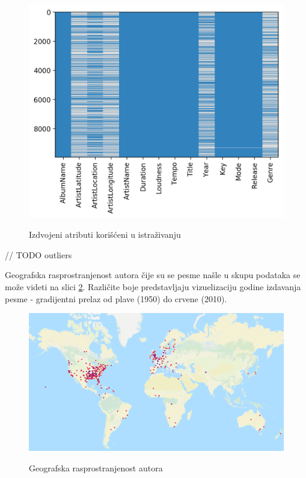 \begin{figure}[H]
    \centering
    \includegraphics[scale=0.6]{resources/after_processing.png}
    \label{fig:after}
    \caption{Izdvojeni atributi kori\v{s}\'c{}eni u istra\v{z}ivanju}
\end{figure}

// TODO outliers

Geografska rasprostranjenost autora \v{c}ije su se pesme na\v{s}le u skupu podataka se mo\v{z}e videti na slici \ref{fig:Geolokacija}. Razli\v{c}ite boje predstavljaju vizuelizaciju godine izdavanja pesme - gradijentni prelaz od plave (1950) do crvene (2010).

\begin{figure}[H]
    \centering
    \includegraphics[scale=0.45]{resources/Geolokacija.png}
    \label{fig:Geolokacija}
    \caption{Geografska rasprostranjenost autora}
\end{figure}

